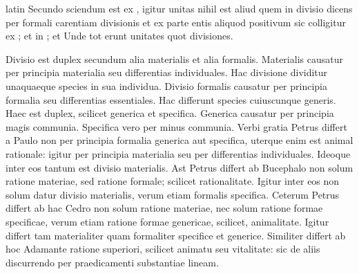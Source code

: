\begin{otherlanguage*}{latin}
\pstart
Secundo sciendum est ex , igitur unitas nihil est aliud quem in divisio dicens per formali carentiam divisionis et ex parte entis aliquod positivum sic colligitur ex ; et in ; et  Unde tot erunt unitates quot divisiones. 
\pend

\pstart
Divisio est duplex secundum  alia materialis et alia formalis. Materialis causatur per principia materialia seu differentias individuales. Hac divisione dividitur unaquaeque species in sua individua. Divisio formalis causatur per principia formalia seu differentias essentiales. Hac differunt species cuiuscunque generis. Haec est duplex, scilicet generica et specifica. Generica causatur per principia magis communia. Specifica vero per minus communia. Verbi gratia Petrus differt a Paulo non per principia formalia generica aut specifica, uterque enim est animal rationale:
igitur per principia materialia seu per differentias individuales. Ideoque inter eos tantum est divisio materialis. Ast Petrus differt ab Bucephalo non solum ratione materiae, sed ratione formale; scilicet rationalitate. Igitur inter eos non solum datur divisio materialis, verum etiam formalis specifica. Ceterum Petrus differt ab hac Cedro non solum ratione materiae, nec solum ratione formae specificae, verum etiam ratione formae genericae, scilicet, animalitate. Igitur differt tam materialiter quam formaliter specifice et generice. Similiter differt ab hoc Adamante ratione superiori, scilicet animatu seu vitalitate:
sic de aliis discurrendo per praedicamenti substantiae lineam. 
\pend


\end{otherlanguage*}

